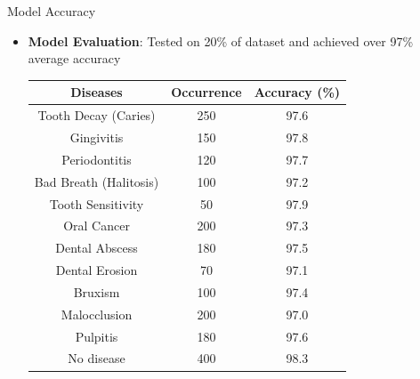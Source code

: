 \documentclass{beamer}
\begin{document}
\begin{frame}{Model Accuracy}
	\begin{itemize}
		\vfill
		\item \textbf{Model Evaluation}: Tested on 20\% of dataset and achieved over 97\% average accuracy
		\begin{table}[h]
			\centering
			\begin{tabular}{|c|c|c|}
				\hline
				\textbf{Diseases}      & \textbf{Occurrence} & \textbf{Accuracy (\%)} \\
				\hline
				Tooth Decay (Caries)   & 250                 & 97.6                   \\
				Gingivitis             & 150                 & 97.8                   \\
				Periodontitis          & 120                 & 97.7                   \\
				Bad Breath (Halitosis) & 100                 & 97.2                   \\
				Tooth Sensitivity      & 50                  & 97.9                   \\
				Oral Cancer            & 200                 & 97.3                   \\
				Dental Abscess         & 180                 & 97.5                   \\
				Dental Erosion         & 70                  & 97.1                   \\
				Bruxism                & 100                 & 97.4                   \\
				Malocclusion           & 200                 & 97.0                   \\
				Pulpitis               & 180                 & 97.6                   \\
				No disease             & 400                 & 98.3                   \\
				\hline
			\end{tabular}
		\end{table}
	\end{itemize}
\end{frame}
\end{document}
